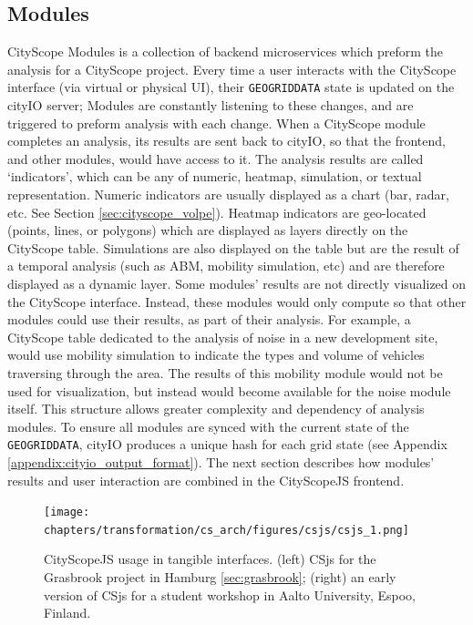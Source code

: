 {{      \subsection{Modules}
      {
          CityScope Modules is a collection of backend microservices which preform the analysis for a CityScope project. Every time a user interacts with the CityScope interface (via virtual or physical UI), their \verb|GEOGRIDDATA| state is updated on the cityIO server; Modules are constantly listening to these changes, and are triggered to preform analysis with each change.
          When a CityScope module completes an analysis, its results are sent back to cityIO, so that the frontend, and other modules, would have access to it. The analysis results are called `indicators', which can be any of numeric, heatmap, simulation, or textual representation. Numeric indicators are usually displayed as a chart (bar, radar, etc. See Section \eqref{sec:cityscope_volpe}). Heatmap indicators are geo-located (points, lines, or polygons) which are displayed as layers directly on the CityScope table. Simulations are also displayed on the table but are the result of a temporal analysis (such as ABM, mobility simulation, etc) and are therefore displayed as a dynamic layer.
          \newline
          Some modules' results are not directly visualized on the CityScope interface. Instead, these modules would only compute so that other modules could use their results, as part of their analysis. For example, a CityScope table dedicated to the analysis of noise in a new development site, would use mobility simulation to indicate the types and volume of vehicles traversing through the area. The results of this mobility module would not be used for visualization, but instead would become available for the noise module itself. This structure allows greater complexity and dependency of analysis modules. To ensure all modules are synced with the current state of the \verb|GEOGRIDDATA|, cityIO produces a unique hash for each grid state (see Appendix \eqref{appendix:cityio_output_format}). The next section describes how modules' results and user interaction are combined in the CityScopeJS frontend.
      }
  }



  \begin{figure}[!htb]
      \begin{center}
          \texttt{[image: chapters/transformation/cs\_arch/figures/csjs/csjs\_1.png]}
      \end{center}
      \caption{CityScopeJS usage in tangible interfaces. (left) CSjs for the Grasbrook project in Hamburg \eqref{sec:grasbrook}; (right) an early version of CSjs for a student workshop in Aalto University, Espoo, Finland.}
      \label{fig:csjs_tui}
  \end{figure}

}
